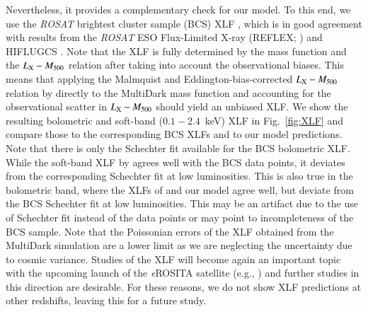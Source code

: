 \documentclass[useAMS,usenatbib]{mn2e}
\begin{document}
Nevertheless, it provides a complementary check for our model. To this end, we
use the \emph{ROSAT} brightest cluster sample (BCS) XLF
\citep{1997ApJ...479L.101E}, which is in good agreement with results from the
\emph{ROSAT} ESO Flux-Limited X-ray (REFLEX; \citealp{2002ApJ...566...93B}) and
HIFLUGCS \citep{2002ApJ...567..716R}.  Note that the XLF is fully determined by
the mass function and the $L_{{\mathrm{X}}}-M_{500}$ relation after taking into
account the observational biases. This means that applying the Malmquist and
Eddington-bias-corrected $L_{{\mathrm{X}}}-M_{500}$ relation by
\cite{2010MNRAS.406.1773M} directly to the MultiDark mass function and
accounting for the observational scatter in $L_{{\mathrm{X}}}-M_{500}$ should yield
an unbiased XLF. We show the resulting bolometric and soft-band ($0.1-2.4$~keV)
XLF in Fig.~\ref{fig:XLF} and compare those to the corresponding BCS XLFs and
to our model predictions. Note that there is only the Schechter fit available
for the BCS bolometric XLF.  While the soft-band XLF by
\cite{2010MNRAS.406.1773M} agrees well with the BCS data points, it deviates
from the corresponding Schechter fit at low luminosities. This is also true in
the bolometric band, where the XLFs of \cite{2010MNRAS.406.1773M} and our model
agree well, but deviate from the BCS Schechter fit at low luminosities. This may
be an artifact due to the use of Schechter fit instead of the data points or may
point to incompleteness of the BCS sample. Note that the Poissonian errors of
the XLF obtained from the MultiDark simulation are a lower limit as we are
neglecting the uncertainty due to cosmic variance.  Studies of the XLF will
become again an important topic with the upcoming launch of the \emph{e}ROSITA
satellite (e.g., \citealp{2011MSAIS..17..159C}) and further studies in this
direction are desirable. For these reasons, we do not show XLF predictions at
other redshifts, leaving this for a future study.
\end{document}
